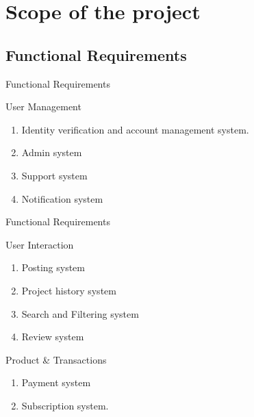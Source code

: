 \documentclass[aspectratio=169]{beamer}
\begin{document}
\section{Scope of the project}
\subsection{Functional Requirements}

\begin{frame}{Functional Requirements}
    \begin{alertblock}{User Management}
        \begin{enumerate}
            \item Identity verification and account management system.
            \item Admin system
            \item Support system
            \item Notification system
        \end{enumerate}
    \end{alertblock}

\end{frame}

\begin{frame}{Functional Requirements}
    \begin{block}{User Interaction}
        \begin{enumerate}
            \item Posting system
            \item Project history system
            \item Search and Filtering system
            \item Review system
        \end{enumerate}
    \end{block}
    \begin{exampleblock}{Product \& Transactions}
        \begin{enumerate}
            \item Payment system
            \item Subscription system.
        \end{enumerate}
    \end{exampleblock}
\end{frame}
\end{document}
